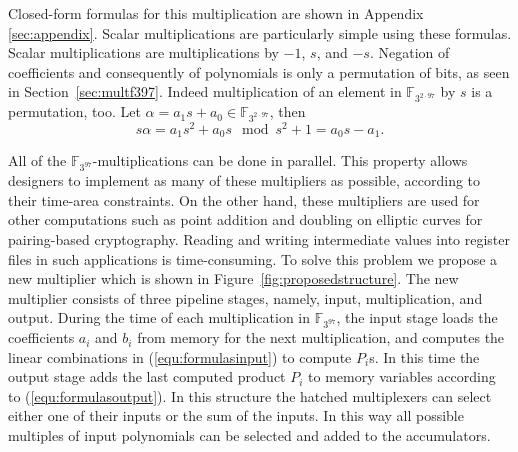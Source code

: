 \documentclass{article}
\newcommand{\F}{\mathbb{F}}
\begin{document}
Closed-form formulas for this multiplication are shown in Appendix
\ref{sec:appendix}. Scalar multiplications are particularly simple
using these formulas. Scalar multiplications are multiplications by
$-1$, $s$, and $-s$. Negation of coefficients and consequently of
polynomials is only a permutation of bits, as seen in
Section~\ref{sec:multf397}.
Indeed multiplication of an element in $\F_{3^{2 \cdot 97}}$ by $s$ is
a permutation, too. 
Let $\alpha = a_1s+a_0 \in \F_{3^{2 \cdot 97}}$, then
$$s \alpha = a_1s^2+a_0s \mod s^2+1 = a_0s-a_1.$$ 

All of the $\F_{3^{97}}$-multiplications can be done in parallel. This
property allows designers to implement as many of these multipliers as
possible, according to their time-area constraints. On the other hand,
these multipliers are used for other computations such as point
addition and doubling on elliptic curves for pairing-based
cryptography. Reading and writing intermediate values into register
files in such applications is time-consuming. 
To solve this problem we propose a new multiplier which is shown in Figure~\ref{fig:proposedstructure}. 
The new multiplier consists of three pipeline stages, namely, input, multiplication, and output. 
During the time of each multiplication in $\F_{3^{97}}$, the input stage loads the coefficients $a_i$ and $b_i$ from memory for the next multiplication, and computes the linear combinations in (\ref{equ:formulasinput}) to compute $P_i$s.
In this time the output stage adds the last computed product $P_i$ to memory variables according to (\ref{equ:formulasoutput}). 
In this structure the hatched multiplexers can select either one of their
inputs or the sum of the inputs. In this way all possible multiples of
input polynomials can be selected and added to the accumulators.
\end{document}
